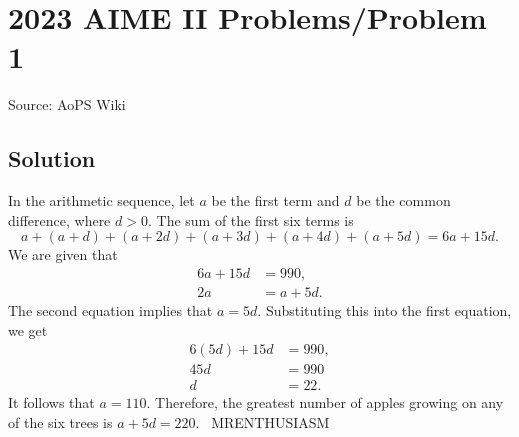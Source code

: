 \documentclass[12pt]{article}
\begin{document}
\section*{{2023 AIME II Problems/Problem 1}}
Source: AoPS Wiki

\subsection*{Solution}
In the arithmetic sequence, let $a$ be the first term and $d$ be the common difference, where $d>0.$ The sum of the first six terms is \[a+(a+d)+(a+2d)+(a+3d)+(a+4d)+(a+5d) = 6a+15d.\] We are given that \begin{align*} 6a+15d &= 990, \\ 2a &= a+5d. \end{align*} The second equation implies that $a=5d.$ Substituting this into the first equation, we get \begin{align*} 6(5d)+15d &=990, \\ 45d &= 990 \\ d &= 22. \end{align*} It follows that $a=110.$ Therefore, the greatest number of apples growing on any of the six trees is $a+5d=\boxed{220}.$ ~MRENTHUSIASM
\end{document}
